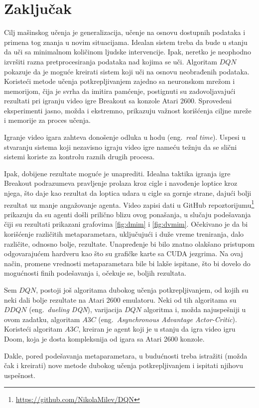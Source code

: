 \chapter{Zaključak}
\label{ch:zakljucak}

Cilj mašinskog učenja je generalizacija, učenje na osnovu dostupnih podataka i primena tog znanja u novim situacijama. Idealan sistem treba da bude u stanju da uči sa minimalnom količinom ljudske intervencije. Ipak, neretko je neophodno izvršiti razna pretprocesiranja podataka nad kojima se uči. Algoritam $DQN$ pokazuje da je moguće kreirati sistem koji uči na osnovu neobrađenih podataka. Koristeći metode učenja potkrepljivanjem zajedno sa neuronskom mrežom i memorijom, čija je svrha da imitira pamćenje, postignuti su zadovoljavajući rezultati pri igranju video igre Breakout sa konzole Atari 2600. Sprovedeni eksperimenti jasno, možda i ekstremno, prikazuju važnost korišćenja ciljne mreže i memorije za proces učenja.
\par 
Igranje video igara zahteva donošenje odluka u hodu (eng.~{\em real time}). Uspesi u stvaranju sistema koji nezavisno igraju video igre nameću težnju da se slični sistemi koriste za kontrolu raznih drugih procesa. 
\par 
Ipak, dobijene rezultate moguće je unaprediti. Idealna taktika igranja igre Breakout podrazumeva pravljenje prolaza kroz cigle i navođenje loptice kroz njega, što daje kao rezultat da loptica udara u cigle sa gornje strane, dajući bolji rezultat uz manje angažovanje agenta. Video zapisi dati u GitHub repoztorijumu\footnote{\url{https://github.com/NikolaMilev/DQN}} prikazuju da su agenti došli prilično blizu ovog ponašanja, u slučaju podešavanja čiji su rezultati prikazani grafovima \ref{fig:dmim} i \ref{fig:dvmim}. Očekivano je da bi korišćenje različitih metaparametara, uključujući i duže vreme treniranja, dalo različite, odnosno bolje, rezultate. Unapređenje bi bilo znatno olakšano pristupom odgovarajućem hardveru kao što su grafičke karte sa CUDA jezgrima. Na ovaj način, promene vrednosti metaparametara bile bi lakše ispitane, što bi dovelo do mogućnosti finih podešavanja i, očekuje se, boljih rezultata.
\par 
Sem $DQN$, postoji još algoritama dubokog učenja potkrepljivanjem, od kojih su neki dali bolje rezultate na Atari 2600 emulatoru. Neki od tih algoritama su $DDQN$ \cite{ddqn} (eng.~{\em dueling DQN}), varijacija $DQN$ algoritma i, možda najuspešniji u ovom zadatku, algoritam $A3C$ \cite{a3c} (eng.~{\em Asynchronous Advantage Actor-Critic}). Koristeći algoritam $A3C$, kreiran je agent koji je u stanju da igra video igru Doom, koja je dosta kompleksnija od igara sa Atari 2600 konzole.
\par 
Dakle, pored podešavanja metaparametara, u budućnosti treba istražiti (možda čak i kreirati) nove metode dubokog učenja potkrepljivanjem i ispitati njihovu uspešnost.



